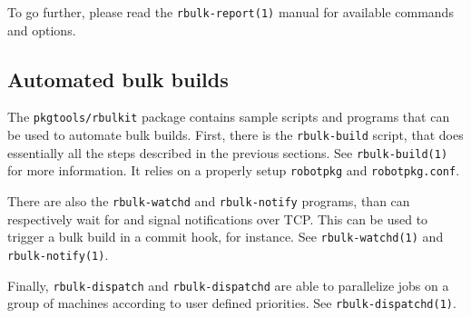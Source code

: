 To go further, please read the {\tt rbulk-report(1)} manual for available
commands and options.

\subsection{Automated bulk builds} %
\label{section:bulk:auto}

The {\tt  pkgtools/rbulkit} package contains  sample scripts and  programs that
can be  used to  automate bulk  builds. First, there  is the  {\tt rbulk-build}
script, that does essentially all the steps described in the previous sections.
See {\tt rbulk-build(1)} for more information. It relies on a properly setup
{\tt robotpkg} and {\tt robotpkg.conf}.

There are also the {\tt rbulk-watchd} and {\tt rbulk-notify} programs, than can
respectively wait for and signal notifications over TCP. This can be used to
trigger a bulk build in a commit hook, for instance. See {\tt rbulk-watchd(1)}
and {\tt rbulk-notify(1)}.

Finally, {\tt rbulk-dispatch} and {\tt rbulk-dispatchd} are able to parallelize
jobs on a group of machines according to user defined priorities. See
{\tt rbulk\--dispatchd(1)}.
